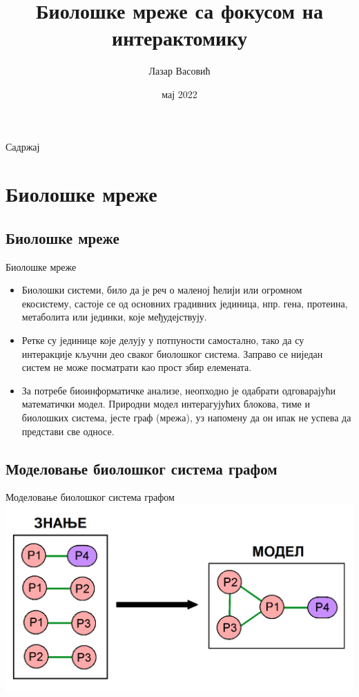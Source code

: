 \documentclass[hyperref={bookmarks=false}]{beamer}
\title[Интерактомика]{Биолошке мреже са фокусом на интерактомику}
\author{Лазар Васовић}
\institute[]{Математички факултет, Универзитет у Београду\\\url{https://github.com/matfija/Neuredjenost-u-interaktomu}}
\date[Математички факултет]{мај 2022}
\begin{document}
\frame{\titlepage}

\begin{frame}{Садржај}
\tableofcontents[subsectionstyle=hide]
\end{frame}

\section{Биолошке мреже}
\subsection{Биолошке мреже}
\begin{frame}{Биолошке мреже}
\begin{itemize}
	\item Биолошки системи, било да је реч о маленој ћелији или огромном екосистему, састоје се од основних градивних јединица, нпр. гена, протеина, метаболита или јединки, које међудејствују.

	\item Ретке су јединице које делују у потпуности самостално, тако да су интеракције кључни део сваког биолошког система. Заправо се ниједан систем не може посматрати као прост збир елемената.

	\item За потребе биоинформатичке анализе, неопходно је одабрати одговарајући математички модел. Природни модел интерагујућих блокова, тиме и биолошких система, јесте граф (мрежа), уз напомену да он ипак не успева да представи све односе.
\end{itemize}
\end{frame}

\subsection{Моделовање биолошког система графом}
\begin{frame}{Моделовање биолошког система графом}
\centering\includegraphics[width=.95\textwidth]{modelovanje.png}
\end{frame}
\end{document}
